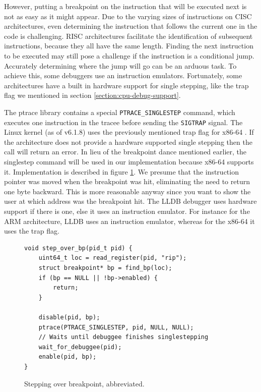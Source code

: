 However, putting a breakpoint on the instruction that will be executed next
is not as easy as it might appear. Due to the varying sizes of instructions
on CISC architectures, even determining the instruction that follows the current
one in the code is challenging. RISC architectures facilitate the identification
of subsequent instructions, because they all have the same length. Finding the
next instruction to be executed may still pose a challenge if the instruction
is a conditional jump. Accurately determining where the jump will go can be
an arduous task. To achieve this, some debuggers use an instruction emulators.
Fortunately, some architectures have a built in hardware support for single
stepping, like the trap flag we mentioned in section
\ref{section:cpu-debug-support}.

The ptrace library contains a special \texttt{PTRACE\_SINGLESTEP} command,
which executes one instruction in the tracee before sending the
\texttt{SIGTRAP} signal. The Linux kernel (as of v6.1.8) uses the previously
mentioned trap flag for x86-64 \cite{linuxkernel-trapflag}. If the architecture
does not provide a hardware supported single stepping then the call will return
an error. In lieu of the breakpoint dance mentioned earlier, the singlestep
command will be used in our implementation because x86-64 supports it.
Implementation is described in figure \ref{fig:singlestep}. We presume that the
instruction pointer was moved when the breakpoint was hit, eliminating the need
to return one byte backward. This is more reasonable anyway since you want to
show the user at which address was the breakpoint hit. The LLDB \cite{lldb}
debugger uses hardware support if there is one, else it uses an instruction
emulator. For instance for the ARM architecture, LLDB uses an instruction
emulator, whereas for the x86-64 it uses the trap flag.

\begin{figure}
    \begin{verbatim}
void step_over_bp(pid_t pid) {
    uint64_t loc = read_register(pid, "rip");
    struct breakpoint* bp = find_bp(loc);
    if (bp == NULL || !bp->enabled) {
        return;
    }

    disable(pid, bp);
    ptrace(PTRACE_SINGLESTEP, pid, NULL, NULL);
    // Waits until debuggee finishes singlestepping
    wait_for_debuggee(pid);
    enable(pid, bp);
}
    \end{verbatim}
    \caption{Stepping over breakpoint, abbreviated.}
    \label{fig:singlestep}
\end{figure}

